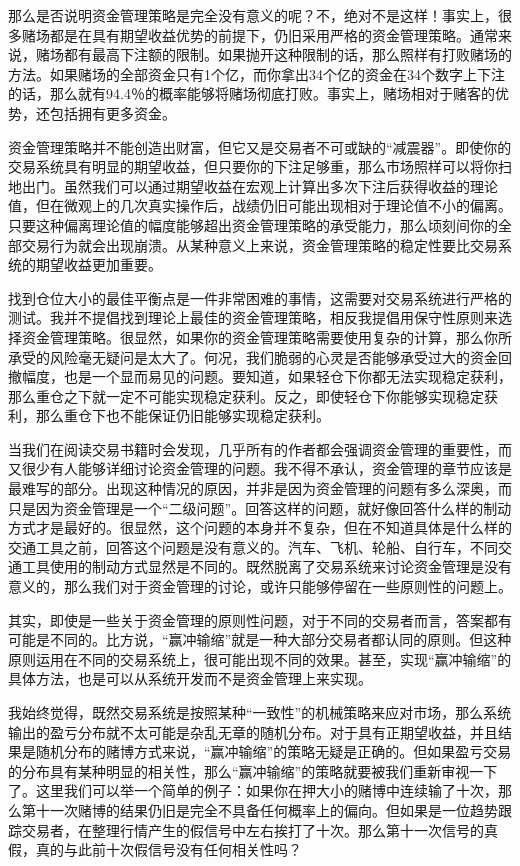 那么是否说明资金管理策略是完全没有意义的呢？不，绝对不是这样！事实上，很多赌场都是在具有期望收益优势的前提下，仍旧采用严格的资金管理策略。通常来说，赌场都有最高下注额的限制。如果抛开这种限制的话，那么照样有打败赌场的方法。如果赌场的全部资金只有1个亿，而你拿出34个亿的资金在34个数字上下注的话，那么就有94.4％的概率能够将赌场彻底打败。事实上，赌场相对于赌客的优势，还包括拥有更多资金。

资金管理策略并不能创造出财富，但它又是交易者不可或缺的“减震器”。即使你的交易系统具有明显的期望收益，但只要你的下注足够重，那么市场照样可以将你扫地出门。虽然我们可以通过期望收益在宏观上计算出多次下注后获得收益的理论值，但在微观上的几次真实操作后，战绩仍旧可能出现相对于理论值不小的偏离。只要这种偏离理论值的幅度能够超出资金管理策略的承受能力，那么顷刻间你的全部交易行为就会出现崩溃。从某种意义上来说，资金管理策略的稳定性要比交易系统的期望收益更加重要。

找到仓位大小的最佳平衡点是一件非常困难的事情，这需要对交易系统进行严格的测试。我并不提倡找到理论上最佳的资金管理策略，相反我提倡用保守性原则来选择资金管理策略。很显然，如果你的资金管理策略需要使用复杂的计算，那么你所承受的风险毫无疑问是太大了。何况，我们脆弱的心灵是否能够承受过大的资金回撤幅度，也是一个显而易见的问题。要知道，如果轻仓下你都无法实现稳定获利，那么重仓之下就一定不可能实现稳定获利。反之，即使轻仓下你能够实现稳定获利，那么重仓下也不能保证仍旧能够实现稳定获利。

当我们在阅读交易书籍时会发现，几乎所有的作者都会强调资金管理的重要性，而又很少有人能够详细讨论资金管理的问题。我不得不承认，资金管理的章节应该是最难写的部分。出现这种情况的原因，并非是因为资金管理的问题有多么深奥，而只是因为资金管理是一个“二级问题”。回答这样的问题，就好像回答什么样的制动方式才是最好的。很显然，这个问题的本身并不复杂，但在不知道具体是什么样的交通工具之前，回答这个问题是没有意义的。汽车、飞机、轮船、自行车，不同交通工具使用的制动方式显然是不同的。既然脱离了交易系统来讨论资金管理是没有意义的，那么我们对于资金管理的讨论，或许只能够停留在一些原则性的问题上。

其实，即使是一些关于资金管理的原则性问题，对于不同的交易者而言，答案都有可能是不同的。比方说，“赢冲输缩”就是一种大部分交易者都认同的原则。但这种原则运用在不同的交易系统上，很可能出现不同的效果。甚至，实现“赢冲输缩”的具体方法，也是可以从系统开发而不是资金管理上来实现。

我始终觉得，既然交易系统是按照某种“一致性”的机械策略来应对市场，那么系统输出的盈亏分布就不太可能是杂乱无章的随机分布。对于具有正期望收益，并且结果是随机分布的赌博方式来说，“赢冲输缩”的策略无疑是正确的。但如果盈亏交易的分布具有某种明显的相关性，那么“赢冲输缩”的策略就要被我们重新审视一下了。这里我们可以举一个简单的例子：如果你在押大小的赌博中连续输了十次，那么第十一次赌博的结果仍旧是完全不具备任何概率上的偏向。但如果是一位趋势跟踪交易者，在整理行情产生的假信号中左右挨打了十次。那么第十一次信号的真假，真的与此前十次假信号没有任何相关性吗？

